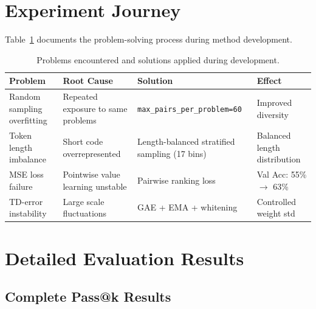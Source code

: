 \section{Experiment Journey}
\label{app:journey}

Table~\ref{tab:experiment_journey} documents the problem-solving process during method development.

\begin{table}[h]
\centering
\caption{Problems encountered and solutions applied during development.}
\label{tab:experiment_journey}
\begin{tabular}{p{3cm}p{4cm}p{4cm}p{3cm}}
\toprule
\textbf{Problem} & \textbf{Root Cause} & \textbf{Solution} & \textbf{Effect} \\
\midrule
Random sampling overfitting & Repeated exposure to same problems & \texttt{max\_pairs\_per\_problem=60} & Improved diversity \\
\midrule
Token length imbalance & Short code overrepresented & Length-balanced stratified sampling (17 bins) & Balanced length distribution \\
\midrule
MSE loss failure & Pointwise value learning unstable & Pairwise ranking loss & Val Acc: 55\% $\rightarrow$ 63\% \\
\midrule
TD-error instability & Large scale fluctuations & GAE + EMA + whitening & Controlled weight std \\
\bottomrule
\end{tabular}
\end{table}

\section{Detailed Evaluation Results}
\label{app:detailed_results}

\subsection{Complete Pass@k Results}

